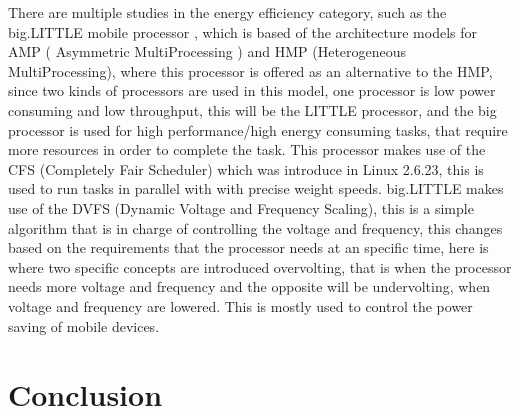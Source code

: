 \documentclass[conference]{IEEEtran}
\begin{document}
There are multiple studies in the energy efficiency category, such as the big.LITTLE mobile processor \cite{KISO01}, which is based of the architecture models for AMP ( Asymmetric MultiProcessing ) and HMP (Heterogeneous MultiProcessing), where this processor is offered as an alternative to the HMP, since two kinds of processors are used in this model, one processor is low power consuming and low throughput, this will be the LITTLE processor, and the big processor is used for high performance/high energy consuming tasks, that require more resources in order to complete the task.
This processor makes use of the CFS (Completely Fair Scheduler) which was introduce in Linux 2.6.23, this is used to run tasks in parallel with with precise weight speeds. 
big.LITTLE makes use of the DVFS (Dynamic Voltage and Frequency Scaling), this is a simple algorithm that is in charge of controlling the voltage and frequency, this changes based on the requirements that the processor needs at an specific time, here is where two specific concepts are introduced overvolting, that is when the processor needs more voltage and frequency and the opposite will be undervolting, when voltage and frequency are lowered. This is mostly used to control the power saving of mobile devices. 

\section{Conclusion}


\nocite{*}


\end{document}
